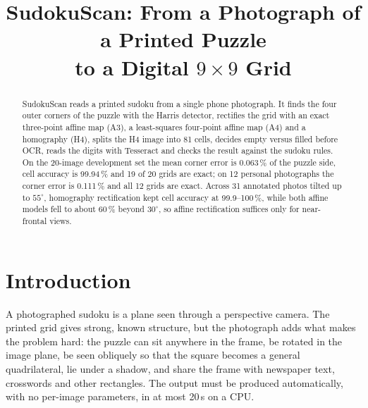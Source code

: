 \documentclass[conference]{IEEEtran}
\begin{document}
\title{SudokuScan: From a Photograph of a Printed Puzzle\\to a Digital $9\times9$ Grid}

\author{
}

\maketitle

\begin{abstract}
SudokuScan reads a printed sudoku from a single phone photograph. It finds the four outer corners of the puzzle with the Harris detector, rectifies the grid with an exact three-point affine map (A3), a least-squares four-point affine map (A4) and a homography (H4), splits the H4 image into 81 cells, decides empty versus filled before OCR, reads the digits with Tesseract and checks the result against the sudoku rules. On the 20-image development set the mean corner error is 0.063\,\% of the puzzle side, cell accuracy is 99.94\,\% and 19 of 20 grids are exact; on 12 personal photographs the corner error is 0.111\,\% and all 12 grids are exact. Across 31 annotated photos tilted up to $55^\circ$, homography rectification kept cell accuracy at 99.9--100\,\%, while both affine models fell to about 60\,\% beyond $30^\circ$, so affine rectification suffices only for near-frontal views.
\end{abstract}

\section{Introduction}
A photographed sudoku is a plane seen through a perspective camera. The printed grid gives strong, known structure, but the photograph adds what makes the problem hard: the puzzle can sit anywhere in the frame, be rotated in the image plane, be seen obliquely so that the square becomes a general quadrilateral, lie under a shadow, and share the frame with newspaper text, crosswords and other rectangles. The output must be produced automatically, with no per-image parameters, in at most 20\,s on a CPU.
\end{document}
